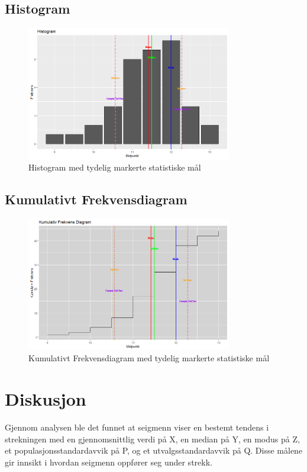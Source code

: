 \documentclass{article}
\begin{document}
\subsection{Histogram}
\begin{figure}[H]
    \centering
    \includegraphics[width=0.8\textwidth]{Rplot01.png}
    \caption{Histogram med tydelig markerte statistiske mål}
\end{figure}

\subsection{Kumulativt Frekvensdiagram}
\begin{figure}[H]
    \centering
    \includegraphics[width=0.8\textwidth]{Rplot.png}
    \caption{Kumulativt Frekvensdiagram med tydelig markerte statistiske mål}
\end{figure}

\section{Diskusjon}
Gjennom analysen ble det funnet at seigmenn viser en bestemt tendens i strekningen med en gjennomsnittlig verdi på X, en median på Y, en modus på Z, et populasjonsstandardavvik på P, og et utvalgsstandardavvik på Q. Disse målene gir innsikt i hvordan seigmenn oppfører seg under strekk.
\end{document}
